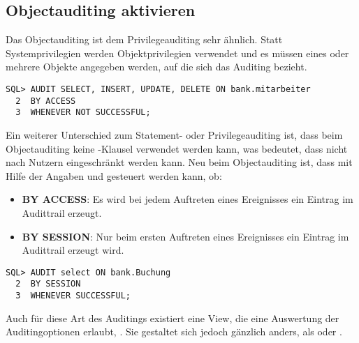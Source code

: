       \subsection{Objectauditing aktivieren}
        Das Objectauditing ist dem Privilegeauditing sehr ähnlich. Statt Systemprivilegien werden Objektprivilegien verwendet und es müssen eines oder mehrere Objekte angegeben werden, auf die sich das Auditing bezieht.
        \begin{lstlisting}[caption={Ein einfaches Objectauditing konfigurieren},label=admin811,language=oracle_sql]
SQL> AUDIT SELECT, INSERT, UPDATE, DELETE ON bank.mitarbeiter
  2  BY ACCESS
  3  WHENEVER NOT SUCCESSFUL;
        \end{lstlisting}
        Ein weiterer Unterschied zum Statement- oder Privilegeauditing ist, dass
        beim Objectauditing keine -Klausel verwendet
        werden kann, was bedeutet, dass nicht nach Nutzern eingeschränkt
        werden kann. Neu beim Objectauditing ist, dass mit Hilfe der Angaben
         und  gesteuert
        werden kann, ob:
        \begin{itemize}
          \item \textbf{BY ACCESS}: Es wird bei jedem Auftreten eines Ereignisses ein Eintrag im Audittrail erzeugt.
          \item \textbf{BY SESSION}: Nur beim ersten Auftreten eines Ereignisses ein Eintrag im Audittrail erzeugt wird.
        \end{itemize}
        \begin{lstlisting}[caption={Nur eine Warnung pro Session für ein Ereignis},label=admin812,language=oracle_sql]
SQL> AUDIT select ON bank.Buchung
  2  BY SESSION
  3  WHENEVER SUCCESSFUL;
        \end{lstlisting}
        Auch für diese Art des Auditings existiert eine View, die eine Auswertung der Auditingoptionen erlaubt, . Sie gestaltet sich jedoch gänzlich anders, als  oder .

